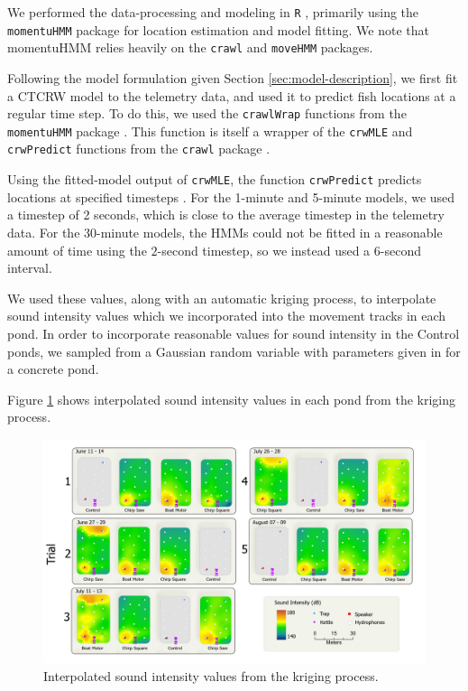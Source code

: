 \documentclass[12pt]{article}
\begin{document}
	We performed the data-processing and modeling in \texttt{R} \cite{Rlang2022}, primarily using the \texttt{momentuHMM} package \cite{McClintock2018} for location estimation and model fitting. We note that momentuHMM relies heavily on the \texttt{crawl} \cite{crawl} and \texttt{moveHMM} \cite{Michelot2016} packages.
	
	Following the model formulation given Section \ref{sec:model-description}, we first fit a CTCRW model to the telemetry data, and used it to predict fish locations at a regular time step. To do this, we used the \texttt{crawlWrap} functions from the \texttt{momentuHMM} package \cite{McClintock2018}. This function is itself a wrapper of the \texttt{crwMLE} and \texttt{crwPredict} functions from the \texttt{crawl} package \cite{crawl}.
	
	Using the fitted-model output of \texttt{crwMLE}, the function \texttt{crwPredict} predicts locations at specified timesteps \cite{crawl, Johnson2008}. For the 1-minute and 5-minute models, we used a timestep of 2 seconds, which is close to the average timestep in the telemetry data. For the 30-minute models, the HMMs could not be fitted in a reasonable amount of time using the $2$-second timestep, so we instead used a 6-second interval.
	
	We used these values, along with an automatic kriging process, to interpolate sound intensity values which we incorporated into the movement tracks in each pond. In order to incorporate reasonable values for sound intensity in the Control ponds, we sampled from a Gaussian random variable with parameters given in \cite{Wysocki2007} for a concrete pond.
	
	Figure \ref{img:intensities} shows interpolated sound intensity values in each pond from the kriging process.
	
	\begin{figure}[H]
		\includegraphics[width=\textwidth]{intensities.png}
		\caption{Interpolated sound intensity values from the kriging process.}
		\label{img:intensities}
	\end{figure}
	
\end{document}
